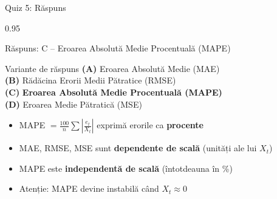 \documentclass[9pt, aspectratio=169, t]{beamer}
\begin{document}
\begin{frame}{Quiz 5: Răspuns}
    \begin{cminipage}{0.95\textwidth}
    \begin{exampleblock}{Răspuns: C -- Eroarea Absolută Medie Procentuală (MAPE)}
    {\small
        \begin{block}{Variante de răspuns}
            \textcolor{MainBlue}{\textbf{(A)}} Eroarea Absolută Medie (MAE) \incorrect\\[3pt]
            \textcolor{MainBlue}{\textbf{(B)}} Rădăcina Erorii Medii Pătratice (RMSE) \incorrect\\[3pt]
            \textcolor{MainBlue}{\textbf{(C)}} \textbf{\textcolor{Forest}{Eroarea Absolută Medie Procentuală (MAPE)}} \correct\\[3pt]
            \textcolor{MainBlue}{\textbf{(D)}} Eroarea Medie Pătratică (MSE) \incorrect
        \end{block}

        \vspace{0.1cm}

        \begin{itemize}\setlength{\itemsep}{0pt}
            \item MAPE $= \frac{100}{n}\sum\left|\frac{e_t}{X_t}\right|$ exprimă erorile ca \textbf{procente}
            \item MAE, RMSE, MSE sunt \textbf{dependente de scală} (unități ale lui $X_t$)
            \item MAPE este \textbf{independentă de scală} (întotdeauna în \%)
            \item Atenție: MAPE devine instabilă când $X_t \approx 0$
        \end{itemize}
    }
    \end{exampleblock}
    
    \end{cminipage}
\end{frame}
\end{document}
